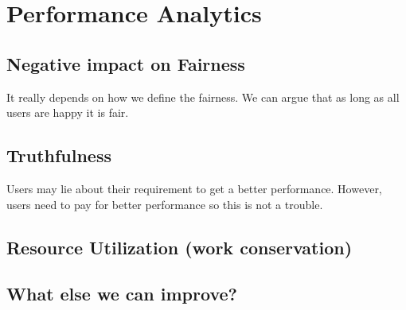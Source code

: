 \section{Performance Analytics}

\subsection{Negative impact on Fairness}

It really depends on how we define the fairness. We can argue that as long as all users are happy it is fair.

\subsection{Truthfulness}

Users may lie about their requirement to get a better performance. However, users need to pay for better performance so this is not a trouble.

\subsection{Resource Utilization (work conservation)}

\subsection{What else we can improve?}

